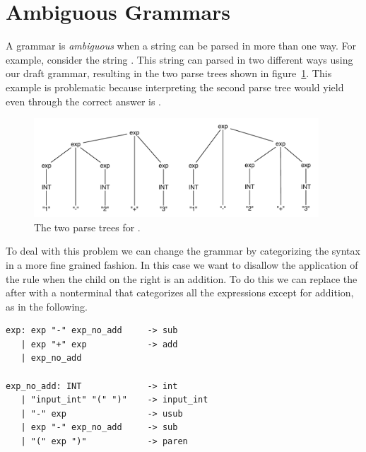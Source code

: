 \documentclass[7x10]{TimesAPriori_MIT}%
\numberwithin{theorem}{chapter}
\numberwithin{definition}{chapter}
\numberwithin{equation}{chapter}
\begin{document}
{\section{Ambiguous Grammars}

A grammar is \emph{ambiguous} when a string
can be parsed in more than one way. For example, consider the string
.  This string can parsed in two different ways using
our draft grammar, resulting in the two parse trees shown in
figure~\ref{fig:ambig-parse-tree}. This example is problematic because
interpreting the second parse tree would yield  even through
the correct answer is .

\begin{figure}[tbp]
\begin{tcolorbox}[colback=white]
\centering
\includegraphics[width=0.95\textwidth]{figs/ambig-parse-tree}
\end{tcolorbox}
\caption{The two parse trees for .}
\label{fig:ambig-parse-tree}
\end{figure}

To deal with this problem we can change the grammar by categorizing
the syntax in a more fine grained fashion. In this case we want to
disallow the application of the rule  when the
child on the right is an addition.  To do this we can replace the
 after  with a nonterminal that categorizes all
the expressions except for addition, as in the following.
\begin{center}
\begin{minipage}{0.95\textwidth}
\begin{lstlisting}[escapechar=$]
exp: exp "-" exp_no_add     -> sub
   | exp "+" exp            -> add
   | exp_no_add

exp_no_add: INT             -> int
   | "input_int" "(" ")"    -> input_int
   | "-" exp                -> usub
   | exp "-" exp_no_add     -> sub
   | "(" exp ")"            -> paren
\end{lstlisting}
\end{minipage}
\end{center}

}
\end{document}

